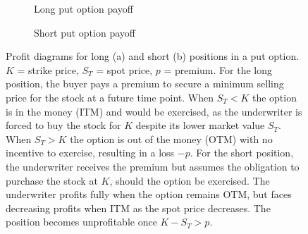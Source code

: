 \documentclass[english,12pt,a4paper,pdftex,sci,utf8]{aaltothesis}
\begin{document}
\begin{figure}[H]
\centering

\begin{subfigure}[t]{0.45\textwidth}
\centering
{}
\caption{Long put option payoff}
\end{subfigure}
\hfill
\begin{subfigure}[t]{0.45\textwidth}
\centering
{}
\caption{Short put option payoff}
\end{subfigure}

\caption{Profit diagrams for long (a) and short (b) positions in a put option. $K$ = strike price, $S_T$ = spot price, $p$ = premium. For the long position, the buyer pays a premium to secure a minimum selling price for the stock at a future time point. When $S_T < K$ the option is in the money (ITM) and would be exercised, as the underwriter is forced to buy the stock for $K$ despite its lower market value $S_T$. When $S_T > K$ the option is out of the money (OTM) with no incentive to exercise, resulting in a loss $-p$. For the short position, the underwriter receives the premium but assumes the obligation to purchase the stock at $K$, should the option be exercised. The underwriter profits fully when the option remains OTM, but faces decreasing profits when ITM as the spot price decreases. The position becomes unprofitable once $K-S_T > p$.}
\label{fig:put_option_payoffs}
\end{figure}
\end{document}
